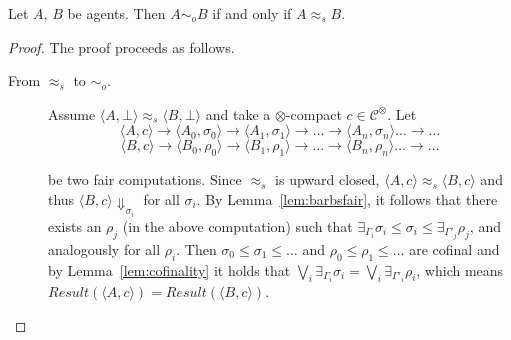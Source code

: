 \documentclass[main.tex]{subfiles}
\begin{document}
\begin{theorem}\label{prop:weaksbequivobs}
Let $A$, $B$ be agents. Then $A \sim_o B$ if and only if $A \approx_{\mathit{s}} B$.
\end{theorem}
\begin{proof}%
	The proof proceeds as follows.
	\begin{description}
		\item[From $\approx_{\mathit{s}}$ to $\sim_o$.] Assume  $\langle A, \bot \rangle \approx_{\mathit{s}} \langle B, \bot \rangle$ and take a $\otimes$-compact $c \in \mathcal{C}^\otimes$. Let
		\begin{equation}\label{comp:1}\langle A, c \rangle \longrightarrow \langle A_0, \sigma_0 \rangle \longrightarrow \langle A_1, \sigma_1 \rangle \longrightarrow \dots \longrightarrow \langle A_n, \sigma_n \rangle \dots \longrightarrow \dots
		\end{equation}
		\begin{equation}\label{comp:2}\langle B, c \rangle \longrightarrow \langle B_0, \rho_0 \rangle \longrightarrow \langle B_1, \rho_1 \rangle \longrightarrow \dots \longrightarrow \langle B_n, \rho_n \rangle \dots \longrightarrow \dots
		\end{equation}
		
		be two fair computations. Since $\approx_{\mathit{s}}$ is upward closed, 
		$\langle A, c \rangle \approx_{\mathit{s}} \langle B, c \rangle$ and thus $\langle B, c\rangle \Downarrow_{\sigma_i}$ for all $\sigma_i$. By Lemma~\ref{lem:barbsfair}, it follows that there exists an $\rho_j$ (in the above computation) such that 
		$\exists_{\Gamma_i} \sigma_i \leq \sigma_i \leq \exists_{\Gamma'_j} \rho_j$, and analogously for all $\rho_i$.
		Then $\sigma_0 \leq \sigma_1 \leq \dots$  and $\rho_0 \leq \rho_1 \leq \dots$ are cofinal and by Lemma~\ref{lem:cofinality} it holds that $\bigvee_i \exists_{\Gamma_i} \sigma_i = \bigvee_i \exists_{\Gamma'_i} \rho_i$, which means 
		$\mathit{Result}(\langle A, c \rangle) = \mathit{Result}(\langle B, c \rangle)$.
		

\end{description}
\end{proof}
\end{document}
